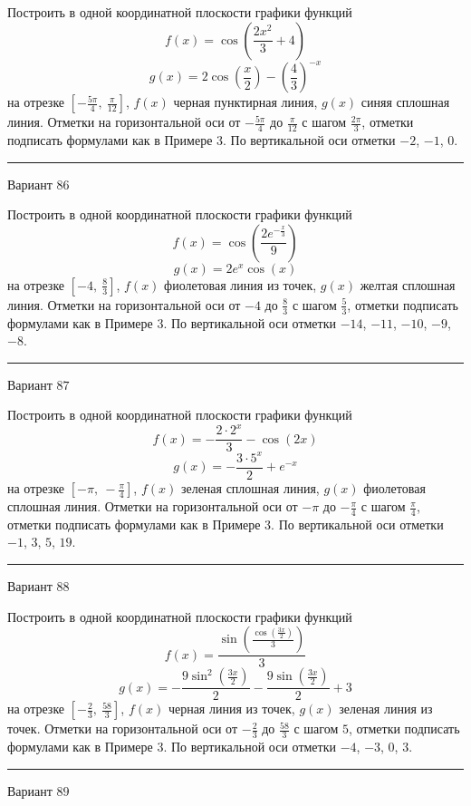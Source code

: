 \documentclass[11pt]{report}
\begin{document}
Построить в одной координатной плоскости графики функций $$f(x) = \cos{\left(\frac{2 x^{2}}{3} + 4 \right)}$$ $$g(x) = 2 \cos{\left(\frac{x}{2} \right)} - \left(\frac{4}{3}\right)^{- x}$$ на отрезке $\left[- \frac{5 \pi}{4}, \  \frac{\pi}{12}\right]$, $f(x)$ черная пунктирная линия, $g(x)$ синяя сплошная линия. Отметки на горизонтальной оси от $- \frac{5 \pi}{4}$ до $\frac{\pi}{12}$ с шагом $\frac{2 \pi}{3}$, отметки подписать формулами как в Примере 3. По вертикальной оси отметки $-2$, $-1$, $0$.
\begin{center}
\noindent\rule{8cm}{0.4pt}
\end{center}
Вариант $86$


Построить в одной координатной плоскости графики функций $$f(x) = \cos{\left(\frac{2 e^{- \frac{x}{3}}}{9} \right)}$$ $$g(x) = 2 e^{x} \cos{\left(x \right)}$$ на отрезке $\left[-4, \  \frac{8}{3}\right]$, $f(x)$ фиолетовая линия из точек, $g(x)$ желтая сплошная линия. Отметки на горизонтальной оси от $-4$ до $\frac{8}{3}$ с шагом $\frac{5}{3}$, отметки подписать формулами как в Примере 3. По вертикальной оси отметки $-14$, $-11$, $-10$, $-9$, $-8$.
\begin{center}
\noindent\rule{8cm}{0.4pt}
\end{center}
Вариант $87$


Построить в одной координатной плоскости графики функций $$f(x) = - \frac{2 \cdot 2^{x}}{3} - \cos{\left(2 x \right)}$$ $$g(x) = - \frac{3 \cdot 5^{x}}{2} + e^{- x}$$ на отрезке $\left[- \pi, \  - \frac{\pi}{4}\right]$, $f(x)$ зеленая сплошная линия, $g(x)$ фиолетовая сплошная линия. Отметки на горизонтальной оси от $- \pi$ до $- \frac{\pi}{4}$ с шагом $\frac{\pi}{4}$, отметки подписать формулами как в Примере 3. По вертикальной оси отметки $-1$, $3$, $5$, $19$.
\begin{center}
\noindent\rule{8cm}{0.4pt}
\end{center}
Вариант $88$


Построить в одной координатной плоскости графики функций $$f(x) = \frac{\sin{\left(\frac{\cos{\left(\frac{3 x}{2} \right)}}{3} \right)}}{3}$$ $$g(x) = - \frac{9 \sin^{2}{\left(\frac{3 x}{2} \right)}}{2} - \frac{9 \sin{\left(\frac{3 x}{2} \right)}}{2} + 3$$ на отрезке $\left[- \frac{2}{3}, \  \frac{58}{3}\right]$, $f(x)$ черная линия из точек, $g(x)$ зеленая линия из точек. Отметки на горизонтальной оси от $- \frac{2}{3}$ до $\frac{58}{3}$ с шагом $5$, отметки подписать формулами как в Примере 3. По вертикальной оси отметки $-4$, $-3$, $0$, $3$.
\begin{center}
\noindent\rule{8cm}{0.4pt}
\end{center}
Вариант $89$
\end{document}

